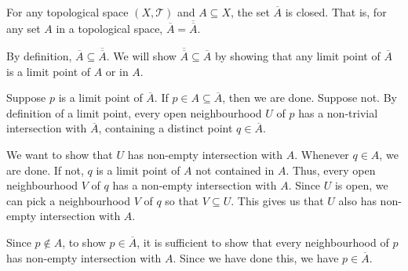 \documentclass[12 pt, letterpaper]{hmcpset}
\begin{document}
\pagebreak

\begin{problem}[Theorem 2.13]
	For any topological space $(X, \mathcal{T})$ and $A \subseteq X$, the set $\overline{A}$ is closed. That is, for any set $A$ in a topological space, $\overline{A} = \overline{\overline{A}}$.
\end{problem}

\begin{solution}
	By definition, $\overline{A} \subseteq \overline{\overline{A}}$. We will show $\overline{\overline{A}} \subseteq \overline{A}$ by showing that any limit point of $\overline{A}$ is a limit point of $A$ or in $A$. 

	Suppose $p$ is a limit point of $\overline{A}$. If $p \in A \subseteq \overline{A}$, then we are done. Suppose not. By definition of a limit point, every open neighbourhood $U$ of $p$ has a non-trivial intersection with $\overline{A}$, containing a distinct point $q \in \overline{A}$.

	We want to show that $U$ has non-empty intersection with $A$. Whenever $q \in A$, we are done. If not, $q$ is a limit point of $A$ not contained in $A$. Thus, every open neighbourhood $V$ of $q$ has a non-empty intersection with $A$. Since $U$ is open, we can pick a neighbourhood $V$ of $q$ so that $V \subseteq U$. This gives us that $U$ also has non-empty intersection with $A$. 

	Since $p \notin A$, to show $p \in \overline{A}$, it is sufficient to show that every neighbourhood of $p$ has non-empty intersection with $A$. Since we have done this, we have $p \in \overline{A}$.
\end{solution}
\end{document}
